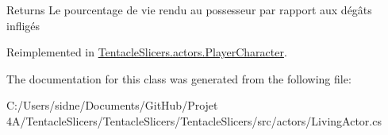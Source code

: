 \begin{DoxyReturn}{Returns}
Le pourcentage de vie rendu au possesseur par rapport aux dégâts infligés 
\end{DoxyReturn}


Reimplemented in \hyperlink{class_tentacle_slicers_1_1actors_1_1_player_character_acc7326054ba178ac92ff43ed0fbaab2d}{Tentacle\+Slicers.\+actors.\+Player\+Character}.



The documentation for this class was generated from the following file\+:\begin{DoxyCompactItemize}
\item 
C\+:/\+Users/sidne/\+Documents/\+Git\+Hub/\+Projet 4\+A/\+Tentacle\+Slicers/\+Tentacle\+Slicers/\+Tentacle\+Slicers/src/actors/Living\+Actor.\+cs\end{DoxyCompactItemize}
